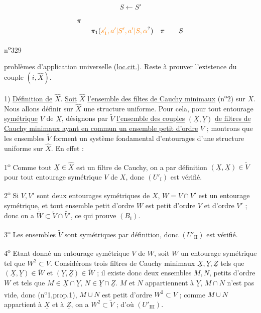 \[
S\longleftarrow S'
\]

\[
\begin{aligned}
&\pi\\[-2pt]
&\qquad\pi_1(\unsure{s'_1,a'|S',a'|S,\alpha})\quad\pi\qquad S
\end{aligned}
\]



\hfill n\textsuperscript{o}329

problèmes d'application universelle (\uline{loc.cit.}). Reste à prouver l'existence du couple $(i,\hat X)$.

1) \uline{Définition de} $\hat X$. \uline{Soit} $\hat X$ \uline{l'ensemble des filtes de Cauchy minimaux} (n\textsuperscript{o}2) sur $X$. Nous allons définir sur $\hat X$ une structure uniforme. Pour cela, pour tout entourage \uline{symétrique} $V$ de $X$, désignons par $\tilde V$ \uline{l'ensemble des couples} $(\underline X,\underline Y)$ \uline{de filtres de Cauchy minimaux ayant en commun un ensemble petit d'ordre} $V$ ; montrons que les ensembles $\tilde V$ forment un système fondamental d'entourages d'une structure uniforme sur $\hat X$. En effet :

1\textsuperscript{o} Comme tout $\underline X\in\hat X$ est un filtre de Cauchy, on a par définition $(\underline X,\underline X)\in\tilde V$ pour tout entourage symétrique $V$ de $X$, donc $(U'_{\mathrm I})$ est vérifié.

2\textsuperscript{o} Si $V,V'$ sont deux entourages symétriques de $X$, $W=V\cap V'$ est un entourage symétrique, et tout ensemble petit d'ordre $W$ est petit d'ordre $V$ et d'ordre $V'$ ; donc on a $\tilde W\subset\tilde V\cap\tilde{V'}$, ce qui prouve $(B_{\mathrm I})$.

3\textsuperscript{o} Les ensembles $\tilde V$ sont symétriques par définition, donc $(U'_{\mathrm{II}})$ est vérifié.

4\textsuperscript{o} Etant donné un entourage symétrique $V$ de $W$, soit $W$ un entourage symétrique tel que $W^2\subset V$. Considérons trois filtres de Cauchy minimaux $\underline X,\underline Y,\underline Z$ tels que $(\underline X,\underline Y)\in\tilde W$ et $(\underline Y,\underline Z)\in\tilde W$ ; il existe donc deux ensembles $M,N$, petits d'ordre $W$ et tels que $M\in\underline X\cap\underline Y$, $N\in\underline Y\cap\underline Z$.  $M$ et $N$ appartiennent à $\underline Y$, $M\cap N$ n'est pas vide, donc (n\textsuperscript{o}1,prop.1), $M\cup N$ est petit d'ordre $W^2\subset V$ ; comme $M\cup N$ appartient à $\underline X$ et à $\underline Z$, on a $W^2\subset\tilde V$ ; d'où $(U'_{\mathrm{III}})$.

